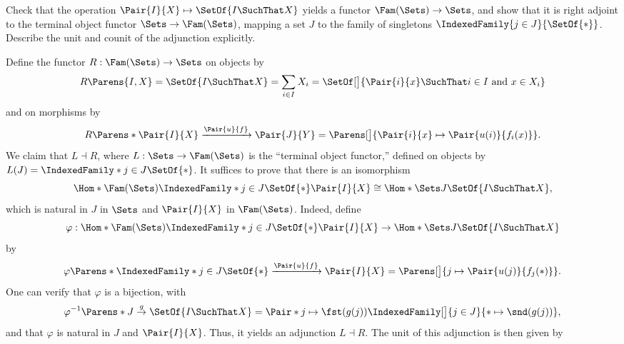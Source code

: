 \begin{exercise}
Check that the operation \(\Pair{I}{X} \mapsto \SetOf{I \SuchThat X}\) yields a functor \(\Fam(\Sets) \to \Sets\), and show that it is right adjoint to the terminal object functor \(\Sets \to \Fam(\Sets)\), mapping a set \(J\) to the family of singletons \(\IndexedFamily{j \in J}{\SetOf{*}}\).
Describe the unit and counit of the adjunction explicitly.
\end{exercise}

\begin{solution}
Define the functor \(R : \Fam(\Sets) \to \Sets\) on objects by
\begin{equation*}
R\Parens{I, X} = \SetOf{I \SuchThat X} = \sum_{i \in I} X_i = \SetOf[\big]{\Pair{i}{x} \SuchThat \text{\(i \in I\) and \(x \in X_i\)}}
\end{equation*}
and on morphisms by
\begin{equation*}
R\Parens*{\Pair{I}{X} \xrightarrow{\Pair{u}{f}} \Pair{J}{Y}}
= \Parens[\big]{\Pair{i}{x} \mapsto \Pair{u(i)}{f_i(x)}}.
\end{equation*}
We claim that \(L \dashv R\), where \(L : \Sets \to \Fam(\Sets)\) is the ``terminal object functor,'' defined on objects by \(L(J) = \IndexedFamily*{j \in J}{\SetOf{*}}\).
It suffices to prove that there is an isomorphism
\begin{equation*}
\Hom*{\Fam(\Sets)}{\IndexedFamily*{j \in J}{\SetOf{*}}}{\Pair{I}{X}}
\cong \Hom*{\Sets}{J}{\SetOf{I \SuchThat X}},
\end{equation*}
which is natural in \(J\) in \(\Sets\) and \(\Pair{I}{X}\) in \(\Fam(\Sets)\).
Indeed, define
\begin{equation*}
\varphi : \Hom*{\Fam(\Sets)}{\IndexedFamily*{j \in J}{\SetOf{*}}}{\Pair{I}{X}}
\to \Hom*{\Sets}{J}{\SetOf{I \SuchThat X}}
\end{equation*}
by
\begin{equation*}
\varphi\Parens*{\IndexedFamily*{j \in J}{\SetOf{*}} \xrightarrow{\Pair{u}{f}} \Pair{I}{X}}
= \Parens[\big]{j \mapsto \Pair{u(j)}{f_j(*)}}.
\end{equation*}
One can verify that \(\varphi\) is a bijection, with
\begin{equation*}
\varphi^{-1}\Parens*{J \overset{g}{\to} \SetOf{I \SuchThat X}}
= \Pair*{j \mapsto \fst (g(j))}{\IndexedFamily[\big]{j \in J}{* \mapsto \snd(g(j))}},
\end{equation*}
and that \(\varphi\) is natural in \(J\) and \(\Pair{I}{X}\).
Thus, it yields an adjunction \(L \dashv R\).
The unit of this adjunction is then given by

\end{solution}
